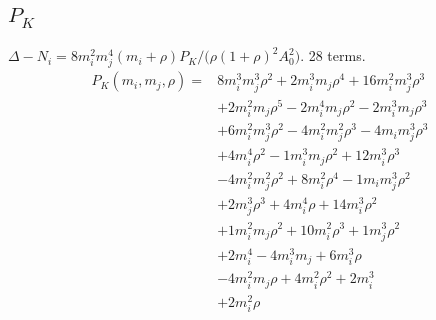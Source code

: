 \subsection*{$P_K$}
$\Delta-N_i=8m_i^2m_j^4(m_i+\rho)P_K/\bigl(\rho(1+\rho)^2A_0^2\bigr)$. 28 terms.
{\small
\begin{align*}
P_K(m_i,m_j,\rho)={}&8m_i^{3}m_j^{3}\rho^{2}+2m_i^{3}m_j\rho^{4}+16m_i^{2}m_j^{3}\rho^{3}\\
&+2m_i^{2}m_j\rho^{5}-2m_i^{4}m_j\rho^{2}-2m_i^{3}m_j\rho^{3}\\
&+6m_i^{2}m_j^{3}\rho^{2}-4m_i^{2}m_j^{2}\rho^{3}-4m_im_j^{3}\rho^{3}\\
&+4m_i^{4}\rho^{2}-1m_i^{3}m_j\rho^{2}+12m_i^{3}\rho^{3}\\
&-4m_i^{2}m_j^{2}\rho^{2}+8m_i^{2}\rho^{4}-1m_im_j^{3}\rho^{2}\\
&+2m_j^{3}\rho^{3}+4m_i^{4}\rho+14m_i^{3}\rho^{2}\\
&+1m_i^{2}m_j\rho^{2}+10m_i^{2}\rho^{3}+1m_j^{3}\rho^{2}\\
&+2m_i^{4}-4m_i^{3}m_j+6m_i^{3}\rho\\
&-4m_i^{2}m_j\rho+4m_i^{2}\rho^{2}+2m_i^{3}\\
&+2m_i^{2}\rho
\end{align*}
}

